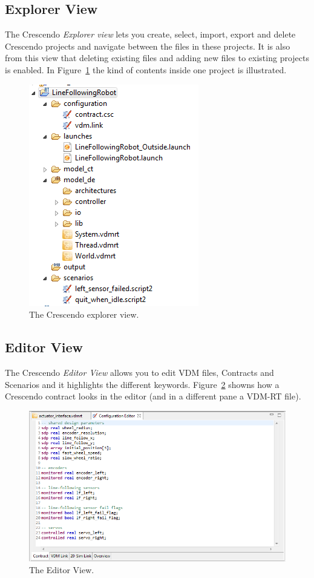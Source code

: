 \documentclass{crescendorepchap}
\begin{document}
\subsection{Explorer View}\label{subsec:explorer}

The Crescendo \emph{Explorer view} lets you create, select, import, export and delete Crescendo
projects and navigate between the files in these projects. It is also from this view that deleting existing files and
adding new files to existing projects is enabled. In Figure~\ref{fig:explorerview} the kind of contents inside one project is illustrated.

\begin{figure}[htbp]
\centering
\includegraphics[width=.3\textwidth]{images/DestecsExplorer.png}
\caption{The Crescendo explorer view.\label{fig:explorerview}}
\end{figure}

\subsection{Editor View}\label{sec:editorview}

The Crescendo \emph{Editor View} allows you to edit VDM files, Contracts and Scenarios and it highlights the different keywords. Figure~\ref{fig:editorcontract1} showns how a Crescendo contract looks in the editor (and in a different pane a VDM-RT file).

\begin{figure}[htbp]
\centering
\includegraphics[width=.6\textwidth]{images/DestecsEditorNewContract.png}
\caption{The Editor View.\label{fig:editorcontract1}}
\end{figure}
\end{document}
